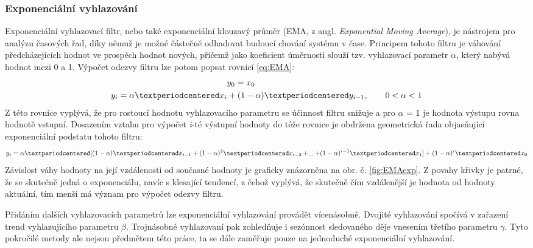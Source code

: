 \documentclass[a4paper, 12pt]{article}
\begin{document}
\subsubsection{Exponenciální vyhlazování}
\label{sec:filtr4}
Exponenciální vyhlazovací filtr, nebo také exponenciální klouzavý průměr (EMA, z angl. \textit{Exponential Moving Average}), je nástrojem pro analýzu časových řad, díky němuž je možné částečně odhadovat budoucí chování systému v čase. Principem tohoto filtru je váhování předcházejících hodnot ve prospěch hodnot nových, přičemž jako koeficient úměrnosti slouží tzv. vyhlazovací parametr $\alpha$, který nabývá hodnot mezi 0 a 1. Výpočet odezvy filtru lze potom popsat rovnicí \ref{eq:EMA}:
\begin{equation} \label{eq:EMA}
\begin{gathered}
    y_{0} = x_{0}\hspace{6em} \\
    y_{i} = \alpha·x_{i}+(1-\alpha)·y_{i-1},\qquad 0<\alpha<1
\end{gathered}
\vspace{0.25cm}
\end{equation}
Z této rovnice vyplývá, že pro rostoucí hodnotu vyhlazovacího parametru se účinnost filtru snižuje a pro $\alpha$ = 1 je hodnota výstupu rovna hodnotě vstupní. Dosazením vztahu pro výpočet \textit{i}-té výstupní hodnoty do téže rovnice je obdržena geometrická řada objasňující exponenciální podstatu tohoto filtru:
\begin{equation} \label{eq:EMAexp}
    y_{i} = \alpha·[(1-\alpha)·x_{i-1}+(1-\alpha)^{2}·x_{i-2}+_{\ldots}+(1-\alpha)^{i-1}·x_{1}]+(1-\alpha)^{i}·x_{0}
\vspace{0.25cm}
\end{equation}
Závislost váhy hodnoty na její vzdálenosti od současné hodnoty je graficky znázorněna na obr. č. \ref{fig:EMAexp}. Z povahy křivky je patrné, že se skutečně jedná o exponenciálu, navíc s klesající tendencí, z čehož vyplývá, že skutečně čím vzdálenější je hodnota od hodnoty aktuální, tím menší má význam pro výpočet odezvy filtru.


Přidáním dalších vyhlazovacích parametrů lze exponenciální vyhlazování provádět vícenásobně. Dvojité vyhlazování spočívá v zařazení trend vyhlazujícího parametru $\beta$. Trojnásobné vyhlazovaní pak zohledňuje i sezónnost sledovaného děje vnesením třetího parametru $\gamma$. Tyto pokročilé metody ale nejsou předmětem této práce, ta se dále zaměřuje pouze na jednoduché exponenciální vyhlazování.
\end{document}
